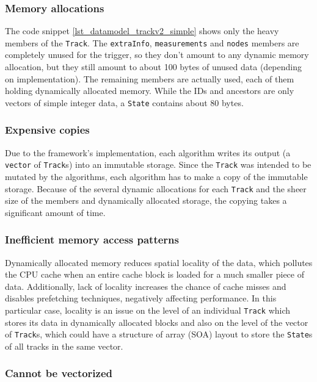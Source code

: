 \documentclass[12pt]{article}
\newcommand{\code}[1]{\texttt{#1}}
\begin{document}
\subsubsection{Memory allocations}

The code snippet \ref{lst_datamodel_trackv2_simple} shows only the heavy members of the \code{Track}. The \code{extraInfo}, \code{measurements} and \code{nodes} members are completely unused for the trigger, so they don't amount to any dynamic memory allocation, but they still amount to about 100 bytes of unused data (depending on implementation). The remaining members are actually used, each of them holding dynamically allocated memory. While the IDs and ancestors are only vectors of simple integer data, a \code{State} contains about 80 bytes.

\subsubsection{Expensive copies}

Due to the framework's implementation, each algorithm writes its output (a \code{vector} of \code{Track}s) into an immutable storage. Since the \code{Track} was intended to be mutated by the algorithms, each algorithm has to make a copy of the immutable storage. Because of the several dynamic allocations for each \code{Track} and the sheer size of the members and dynamically allocated storage, the copying takes a significant amount of time.

\subsubsection{Inefficient memory access patterns}

Dynamically allocated memory reduces spatial locality of the data, which pollutes the CPU cache when an entire cache block is loaded for a much smaller piece of data. Additionally, lack of locality increases the chance of cache misses and disables prefetching techniques, negatively affecting performance. In this particular case, locality is an issue on the level of an individual \code{Track} which stores its data in dynamically allocated blocks and also on the level of the vector of \code{Track}s, which could have a structure of array (SOA) layout to store the \code{State}s of all tracks in the same vector.

\subsubsection{Cannot be vectorized}
\end{document}

